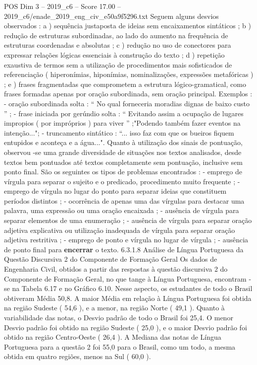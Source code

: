 \begin{textsample}{POS Dim 3 – 2019\_c6 – Score 17.00 – 2019\_c6/enade\_2019\_eng\_civ\_e50a9f5296.txt}
Seguem alguns desvios observados : a ) sequência justaposta de ideias sem encaixamentos sintáticos ; b ) redução de estruturas subordinadas, ao lado do aumento na frequência de estruturas coordenadas e absolutas ; c ) redução no uso de conectores para expressar relações lógicas essenciais à construção do texto ; d ) repetição exaustiva de termos sem a utilização de procedimentos mais sofisticados de referenciação ( hiperonímias, hiponímias, nominalizações, expressões metafóricas ) ; e ) frases fragmentadas que comprometem a estrutura lógico-gramatical, como frases formadas apenas por oração subordinada, sem oração principal.
Exemplos : - oração subordinada solta : “ No qual forneceria moradias dignas de baixo custo ” ; - frase iniciada por gerúndio solta : “ Evitando assim a ocupação de lugares impropios ( por impróprios ) para viver ” ;"Podendo também fazer eventos na intenção..."; - truncamento sintático : “... isso faz com que os bueiros fiquem entupidos e aconteça e a água...".
Quanto à utilização dos sinais de pontuação, observou -se uma grande diversidade de situações nos textos analisados, desde textos bem pontuados até textos completamente sem pontuação, inclusive sem ponto final.
São os seguintes os tipos de problemas encontrados : - emprego de vírgula para separar o sujeito e o predicado, procedimento muito frequente ; - emprego de vírgula no lugar do ponto para separar ideias que constituem períodos distintos ; - ocorrência de apenas uma das vírgulas para destacar uma palavra, uma expressão ou uma oração encaixada ; - ausência de vírgula para separar elementos de uma enumeração ; - ausência de vírgula para separar oração adjetiva explicativa ou utilização inadequada de vírgula para separar oração adjetiva restritiva ; - emprego de ponto e vírgula no lugar de vírgula ; - ausência de ponto final para \textbf{encerrar} o texto. 6.3.1.8 Análise de Língua Portuguesa da Questão Discursiva 2 do Componente de Formação Geral Os dados de Engenharia Civil, obtidos a partir das respostas à questão discursiva 2 do Componente de Formação Geral, no que tange à Língua Portuguesa, encontram -se na Tabela 6.17 e no Gráfico 6.10.
Nesse aspecto, os estudantes de todo o Brasil obtiveram Média 50,8.
A maior Média em relação à Língua Portuguesa foi obtida na região Sudeste ( 54,6 ), e a menor, na região Norte ( 49,1 ).
Quanto à variabilidade das notas, o Desvio padrão de todo o Brasil foi 25,4.
O menor Desvio padrão foi obtido na região Sudeste ( 25,0 ), e o maior Desvio padrão foi obtido na região Centro-Oeste ( 26,4 ).
A Mediana das notas de Língua Portuguesa para a questão 2 foi 55,0 para o Brasil, como um todo, a mesma obtida em quatro regiões, menos na Sul ( 60,0 ).

\end{textsample}
